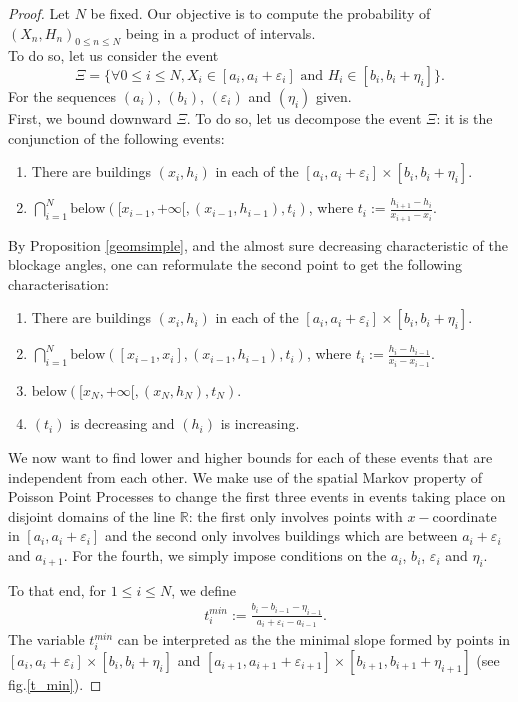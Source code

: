 \documentclass[10pt,english,a4paper]{smfart}
\theoremstyle{definition}
\theoremstyle{remark}
\newcommand{\R}{\mathbb{R}}
\newcommand{\below}[3]{\mathrm{below}\left(#1, #2, #3\right)}
\newcommand{\event}{\Xi}
\renewcommand{\epsilon}{\varepsilon}
\begin{document}
\begin{proof}
Let $N$ be fixed. Our objective is to compute the probability of $(X_n, H_n)_{0\leq n\leq N}$ being in a product of intervals.\\
To do so, let us consider the event 
\[\event  = \{\forall 0\leq i\leq N, X_i\in [a_i, a_i+\epsilon_i] \text{ and } H_i\in [b_i, b_i+\eta_i]\}.\]
For the sequences $(a_i)$, $(b_i)$, $(\epsilon_i)$ and $(\eta_i)$ given.\\
First, we bound downward $\event$. To do so, let us decompose the event $\event$: it is the conjunction of the following events:
\begin{enumerate}
    \item There are buildings $(x_i, h_i)$ in each of the $[a_i, a_i+\epsilon_i]\times[b_i, b_i+\eta_i]$.
    \item $\displaystyle\bigcap_{i=1}^{N}\below{[x_{i-1}, +\infty[}{(x_{i-1}, h_{i-1})}{t_i}$, where $t_i := \frac{h_{i+1}-h_i}{x_{i+1}-x_i}$.
\end{enumerate}
By Proposition \ref{geomsimple}, and the almost sure decreasing characteristic of the blockage angles, one can reformulate the second point to get the following characterisation:
\begin{enumerate}
    \item There are buildings $(x_i, h_i)$ in each of the $[a_i, a_i+\epsilon_i]\times[b_i, b_i+\eta_i]$.
    \item $\displaystyle\bigcap_{i=1}^{N}\below{[x_{i-1}, x_{i}]}{(x_{i-1}, h_{i-1})}{t_i}$, where $t_i := \frac{h_i-h_{i-1}}{x_i-x_{i-1}}$.
    \item $\below{[x_N, +\infty[}{(x_N, h_N)}{t_N}$.
    \item $(t_i)$ is decreasing and $(h_i)$ is increasing.
\end{enumerate}
We now want to find lower and higher bounds for each of these events that are independent from each other. We make use of the spatial Markov property of Poisson Point Processes to change the first three events in events taking place on disjoint domains of the line $\R$: the first only involves points with $x-$coordinate in $[a_i, a_i+\epsilon_i]$ and the second only involves buildings which are between $a_i+\epsilon_i$ and $a_{i+1}$. For the fourth, we simply impose conditions on the $a_i$, $b_i$, $\epsilon_i$ and $\eta_i$.

To that end, for $1\leq i\leq N$, we define
    \begin{align*}
    & t^{min}_{i}:= \frac{b_{i}-b_{i-1}-\eta_{i-1}}{a_{i}+\epsilon_i-a_{i-1}}.
    \end{align*}
    The variable $t^{min}_{i}$ can be interpreted as the the minimal slope formed by points in $[a_i, a_i + \epsilon_i]\times [b_i, b_i+\eta_i]$ and $[a_{i+1}, a_{i+1} + \epsilon_{i+1}]\times [b_{i+1}, b_{i+1}+\eta_{i+1}]$ (see fig.\ref{t_min}).
    


\end{proof}
\end{document}

